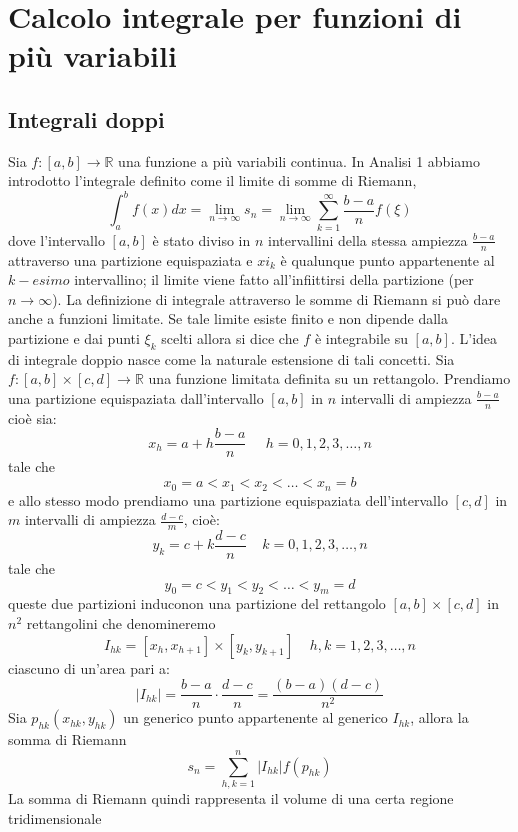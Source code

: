 \documentclass[a4paper]{article}
\numberwithin{equation}{subsection}
\begin{document}
\section{Calcolo integrale per funzioni di più variabili}

\subsection{Integrali doppi}

Sia $f : [a,b] \rightarrow \mathbb{R}$ una funzione a più variabili continua. 
In Analisi 1 abbiamo introdotto l'integrale definito come il limite di somme di Riemann, 
\[\int_{a}^{b} f(x)dx = \lim_{n \rightarrow \infty} s_n = \lim_{n \rightarrow \infty} \sum_{k = 1}^{\infty} \frac{b - a}{n}f(\xi)\]
dove l'intervallo $[a,b]$ è stato diviso in $n$ intervallini della stessa ampiezza $\frac{b - a}{n}$ attraverso una partizione
equispaziata e $xi_k$ è qualunque punto appartenente al $k-esimo$ intervallino; il limite viene fatto all'infiittirsi della partizione (per $n \rightarrow \infty$).
La definizione di integrale attraverso le somme di Riemann si può dare anche a funzioni limitate.
Se tale limite esiste finito e non dipende dalla partizione e dai punti $\xi_k$ scelti allora si dice che $f$ è integrabile su $[a,b]$.
L'idea di integrale doppio nasce come la naturale estensione di tali concetti. 
Sia $f : [a,b] \times [c,d] \rightarrow \mathbb{R}$ una funzione limitata definita su un rettangolo.
Prendiamo una partizione equispaziata dall'intervallo $[a,b]$ in $n$ intervalli di ampiezza $\frac{b-a}{n}$ cioè sia:
\[x_h = a + h\frac{b-a}{n} \; \; \; \; \; h = 0,1,2,3, \dots, n\]
tale che
\[x_0 = a < x_1 < x_2 < \dots < x_n = b\]
e allo stesso modo prendiamo una partizione equispaziata dell'intervallo $[c,d]$ in $m$ intervalli di ampiezza $\frac{d-c}{m}$, cioè:
\[y_k = c + k \frac{d - c}{n} \; \; \; \; k = 0,1,2,3,\dots,n\]
tale che
\[y_0 = c < y_1 < y_2 < \dots < y_m = d\]
queste due partizioni induconon una partizione del rettangolo $[a,b] \times [c,d]$ in $n^2$ rettangolini che denomineremo
\[I_{hk} = [x_h, x_{h+1}] \times [y_k, y_{k+1}] \; \; \; \; h,k = 1,2,3,\dots,n\]
ciascuno di un'area pari a:
\[| I_{hk} | = \frac{b-a}{n} \cdot \frac{d-c}{n} = \frac{(b-a)(d-c)}{n^2}\]
Sia $p_{hk} (x_{hk}, y_{hk})$  un generico punto appartenente al generico $I_{hk}$, allora la somma di Riemann
\begin{equation}
    s_n = \sum_{h,k=1}^{n} |I_{hk}|f(p_{hk}) 
\end{equation}
La somma di Riemann quindi rappresenta il volume di una certa regione tridimensionale
\end{document}
